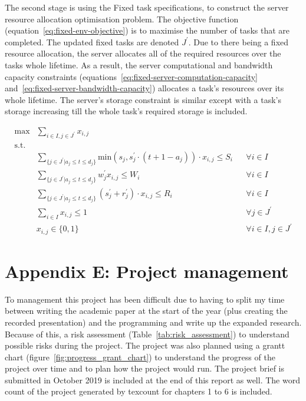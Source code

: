 The second stage is using the Fixed task specifications, to construct the server resource allocation optimisation
problem. The objective function (equation~\ref{eq:fixed-env-objective}) is to maximise the number of tasks that are
completed. The updated fixed tasks are denoted $J^{'}$. Due to there being a fixed resource allocation, the server
allocates all of the required resources over the tasks whole lifetime. As a result, the server computational and
bandwidth capacity constraints (equations~\ref{eq:fixed-server-computation-capacity}
and~\ref{eq:fixed-server-bandwidth-capacity}) allocates a task's resources over its whole lifetime. The server's storage
constraint is similar except with a task's storage increasing till the whole task's required storage is included.

\begin{align}
    \text{max} & \sum_{i \in I, j \in J^{'}} x_{i,j} \label{eq:fixed-env-objective} \\
    \mbox{s.t.} \nonumber \\
    & \sum_{\{j \in J^{'} | a_j \leq t \leq d_j\}} \text{min}(s_j, s^{'}_j \cdot (t + 1 - a_j)) \cdot x_{i,j} \leq S_i && \forall{i \in I} \label{eq:fixed-server-storage-capacity} \\
    & \sum_{\{j \in J^{'} | a_j \leq t \leq d_j\}} w^{'}_j x_{i,j} \leq W_i && \forall{i \in I} \label{eq:fixed-server-computation-capacity} \\
    & \sum_{\{j \in J^{'} | a_j \leq t \leq d_j\}} (s^{'}_j + r^{'}_j) \cdot x_{i,j} \leq R_i && \forall{i \in I} \label{eq:fixed-server-bandwidth-capacity} \\
    & \sum_{i \in I} x_{i,j} \leq 1 && \forall{j \in J^{'}} \label{eq:fixed-env-allocation-limit} \\
    & x_{i,j} \in \{0, 1\} && \forall{i \in I, j \in J^{'}} \label{eq:fixed-env-allocation-set}
\end{align}

\section*{Appendix E: Project management}
\label{app:project-management}
To management this project has been difficult due to having to split my time between writing the academic paper at the
start of the year (plus creating the recorded presentation) and the programming and write up the expanded research.
Because of this, a risk assessment (Table~\ref{tab:risk_assessment}) to understand possible risks during the project.
The project was also planned using a grantt chart (figure~\ref{fig:progress_grant_chart}) to understand the progress of
the project over time and to plan how the project would run. The project brief is submitted in October 2019
is included at the end of this report as well. The word count of the project generated by texcount for chapters 1 to 6
is included.

